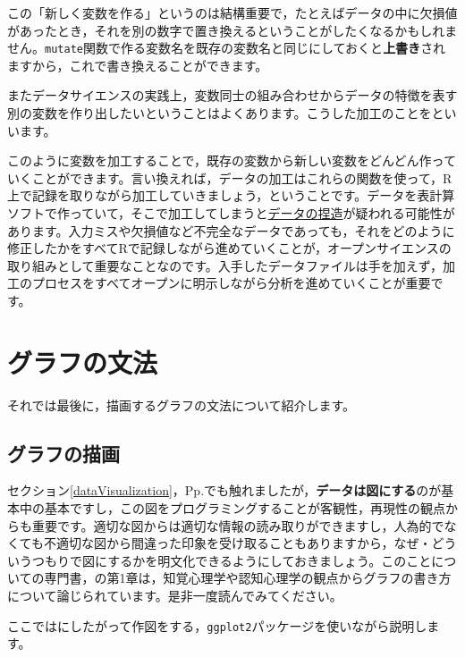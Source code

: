 \documentclass{ltjsbook}
\begin{document}
この「新しく変数を作る」というのは結構重要で，たとえばデータの中に欠損値があったとき，それを別の数字で置き換えるということがしたくなるかもしれません。\verb|mutate|関数で作る変数名を既存の変数名と同じにしておくと\textbf{上書き}されますから，これで書き換えることができます。

またデータサイエンスの実践上，変数同士の組み合わせからデータの特徴を表す別の変数を作り出したいということはよくあります。こうした加工のことをといいます。

このように変数を加工することで，既存の変数から新しい変数をどんどん作っていくことができます。言い換えれば，データの加工はこれらの関数を使って，R上で記録を取りながら加工していきましょう，ということです。データを表計算ソフトで作っていて，そこで加工してしまうと\underline{データの捏造}が疑われる可能性があります。入力ミスや欠損値など不完全なデータであっても，それをどのように修正したかをすべてRで記録しながら進めていくことが，オープンサイエンスの取り組みとして重要なことなのです。入手したデータファイルは手を加えず，加工のプロセスをすべてオープンに明示しながら分析を進めていくことが重要です。

\section{グラフの文法}
それでは最後に，描画するグラフの文法について紹介します。

\subsection{グラフの描画}
セクション\ref{dataVisualization}，Pp.\pageref{dataVisualization}でも触れましたが，\textbf{データは図にする}のが基本中の基本ですし，この図をプログラミングすることが客観性，再現性の観点からも重要です。適切な図からは適切な情報の読み取りができますし，人為的でなくても不適切な図から間違った印象を受け取ることもありますから，なぜ・どういうつもりで図にするかを明文化できるようにしておきましょう。このことについての専門書，\textcite{Kieran2018}の第1章は，知覚心理学や認知心理学の観点からグラフの書き方について論じられています。是非一度読んでみてください。

ここではにしたがって作図をする，\texttt{ggplot2}パッケージ\parencite{ggplot2}を使いながら説明します。
\end{document}
